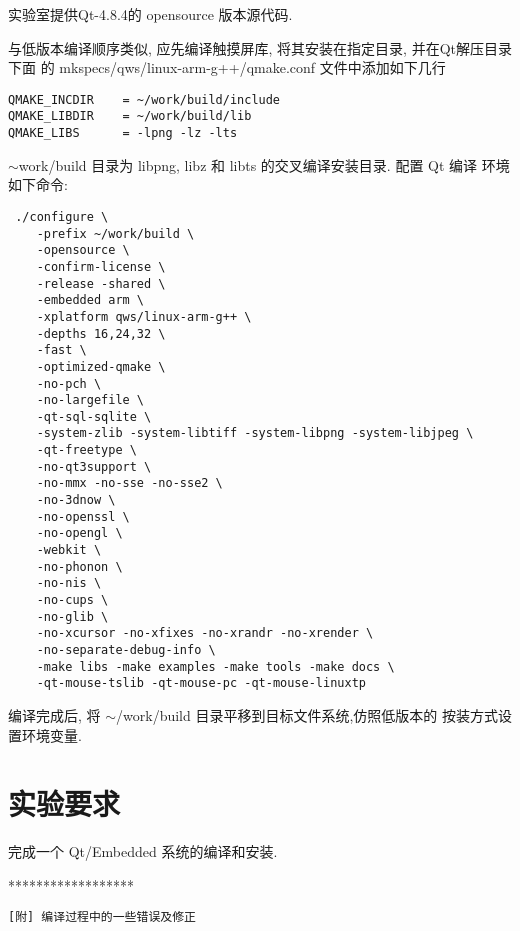 实验室提供Qt-4.8.4的 opensource 版本源代码.

与低版本编译顺序类似, 应先编译触摸屏库, 将其安装在指定目录, 并在Qt解压目录下面
的 mkspecs/qws/linux-arm-g++/qmake.conf 文件中添加如下几行
\begin{verbatim}
QMAKE_INCDIR    = ~/work/build/include
QMAKE_LIBDIR    = ~/work/build/lib
QMAKE_LIBS      = -lpng -lz -lts
\end{verbatim}

$\sim$work/build 目录为 libpng, libz 和 libts 的交叉编译安装目录. 配置 Qt 编译
环境如下命令:

\begin{verbatim}
 ./configure \
    -prefix ~/work/build \
    -opensource \
    -confirm-license \
    -release -shared \
    -embedded arm \
    -xplatform qws/linux-arm-g++ \
    -depths 16,24,32 \
    -fast \
    -optimized-qmake \
    -no-pch \
    -no-largefile \
    -qt-sql-sqlite \
    -system-zlib -system-libtiff -system-libpng -system-libjpeg \
    -qt-freetype \
    -no-qt3support \
    -no-mmx -no-sse -no-sse2 \
    -no-3dnow \
    -no-openssl \
    -no-opengl \
    -webkit \
    -no-phonon \
    -no-nis \
    -no-cups \
    -no-glib \
    -no-xcursor -no-xfixes -no-xrandr -no-xrender \
    -no-separate-debug-info \
    -make libs -make examples -make tools -make docs \
    -qt-mouse-tslib -qt-mouse-pc -qt-mouse-linuxtp
\end{verbatim}

编译完成后, 将 $\sim$/work/build 目录平移到目标文件系统,仿照低版本的
按装方式设置环境变量.


\section{实验要求}
	完成一个 Qt/Embedded 系统的编译和安装.
\newpage
\begin{center} ****************** \end{center}
\tt [附] 编译过程中的一些错误及修正


